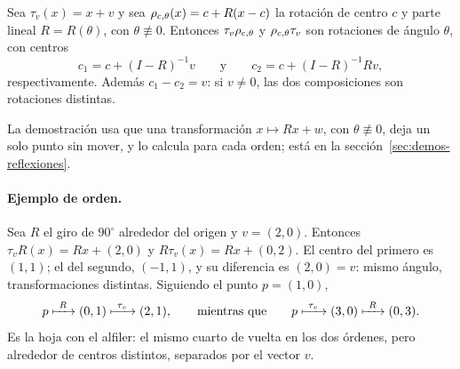 \begin{proposicion}\label{prop:traslacion-rotacion}
Sea \(\tau_v(x)=x+v\) y sea \(\rho_{c,\theta}(x)=c+R(x-c)\) la rotación de centro \(c\) y parte lineal
\(R=R(\theta)\), con \(\theta\not\equiv0\). Entonces \(\tau_v\rho_{c,\theta}\) y \(\rho_{c,\theta}\tau_v\) son rotaciones de
ángulo \(\theta\), con centros
\[
  \boxed{c_1=c+(I-R)^{-1}v}
  \qquad\text{y}\qquad
  \boxed{c_2=c+(I-R)^{-1}Rv},
\]
respectivamente. Además \(c_1-c_2=v\): si \(v\neq0\), las dos composiciones son rotaciones
distintas.
\end{proposicion}

La demostración usa que una transformación \(x\mapsto Rx+w\), con \(\theta\not\equiv0\), deja un
solo punto sin mover, y lo calcula para cada orden; está en la
sección~\ref{sec:demos-reflexiones}.

\begin{center}
\end{center}

\paragraph{Ejemplo de orden.}
Sea \(R\) el giro de \(90^\circ\) alrededor del origen y \(v=(2,0)\). Entonces
\(\tau_vR(x)=Rx+(2,0)\) y \(R\tau_v(x)=Rx+(0,2)\). El centro del primero es \((1,1)\); el del segundo,
\((-1,1)\), y su diferencia es \((2,0)=v\): mismo ángulo, transformaciones distintas. Siguiendo
el punto \(p=(1,0)\),
\[
p\xmapsto{\ R\ }(0,1)\xmapsto{\ \tau_v\ }(2,1),
\qquad\text{mientras que}\qquad
p\xmapsto{\ \tau_v\ }(3,0)\xmapsto{\ R\ }(0,3).
\]
Es la hoja con el alfiler: el mismo cuarto de vuelta en los dos órdenes, pero alrededor de
centros distintos, separados por el vector \(v\).

